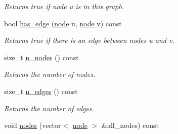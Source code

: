 \begin{DoxyCompactItemize}
\begin{DoxyCompactList}\small\item\em Returns true if node {\itshape u} is in this graph. \end{DoxyCompactList}\item 
bool \hyperlink{classlgraph_1_1utils_1_1xxgraph_a0bb7c5fc708596fff406cf3240ecd6b2}{has\+\_\+edge} (\hyperlink{namespacelgraph_1_1utils_ab9c6b34241f0b68372c55f34c460e863}{node} u, \hyperlink{namespacelgraph_1_1utils_ab9c6b34241f0b68372c55f34c460e863}{node} v) const 
\begin{DoxyCompactList}\small\item\em Returns true if there is an edge between nodes {\itshape u} and {\itshape v}. \end{DoxyCompactList}\item 
size\+\_\+t \hyperlink{classlgraph_1_1utils_1_1xxgraph_ad345f1fbf1dee34e1579b5aea9aef9b2}{n\+\_\+nodes} () const 
\begin{DoxyCompactList}\small\item\em Returns the number of nodes. \end{DoxyCompactList}\item 
size\+\_\+t \hyperlink{classlgraph_1_1utils_1_1xxgraph_af3f7c3835406c2cbf70479ae1c0253c9}{n\+\_\+edges} () const 
\begin{DoxyCompactList}\small\item\em Returns the number of edges. \end{DoxyCompactList}\item 
void \hyperlink{classlgraph_1_1utils_1_1xxgraph_a99f83387aa9f59b861e675251be5a3ad}{nodes} (vector$<$ \hyperlink{namespacelgraph_1_1utils_ab9c6b34241f0b68372c55f34c460e863}{node} $>$ \&all\+\_\+nodes) const \hypertarget{classlgraph_1_1utils_1_1xxgraph_a99f83387aa9f59b861e675251be5a3ad}{}\label{classlgraph_1_1utils_1_1xxgraph_a99f83387aa9f59b861e675251be5a3ad}


\end{DoxyCompactItemize}
